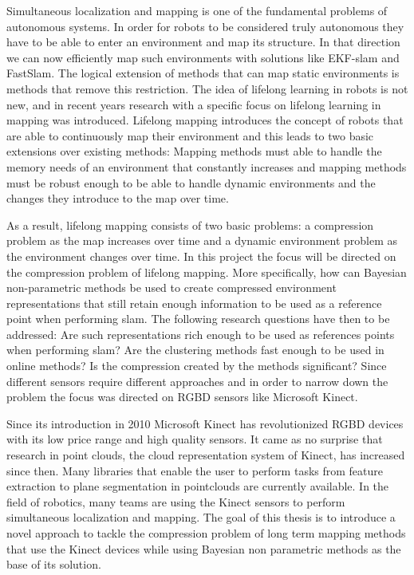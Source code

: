 \documentclass[twoside,hidelinks]{article}
\begin{document}
Simultaneous localization and mapping is one of the fundamental problems of autonomous systems\cite{probRobs}. In order for robots to be considered truly autonomous they have to be able to enter an environment and map its structure. In that direction we can now efficiently map such environments with solutions like EKF-slam\cite{ekf} and FastSlam\cite{slam}. The logical extension of methods that can map static environments is methods that remove this restriction. The idea of lifelong learning in robots is not new\cite{liflonglearning}, and in recent years research with a specific focus on lifelong learning in mapping\cite{lifelongmaps} was introduced.  Lifelong mapping introduces the concept of robots that are able to continuously map their environment and this leads to two basic extensions over existing methods: Mapping methods must able to handle the memory needs of an environment that constantly increases and mapping methods must be robust enough to be able to handle dynamic environments and the changes they introduce to the map over time.

As a result, lifelong mapping consists of two basic problems: a compression problem as the map increases over time and a dynamic environment problem as the environment changes over time\cite{aishalong}. In this project the focus will be directed on the compression problem of lifelong mapping. More specifically, how can Bayesian non-parametric methods be used to create compressed environment representations that still retain enough information to be used as a reference point when performing slam. The following research questions have then to be addressed: Are such representations rich enough to be used as references points when performing slam? Are the clustering methods fast enough to be used in online methods? Is the compression created by the methods significant? Since different sensors require different approaches and in order to narrow down the problem the focus was directed on RGBD sensors like Microsoft Kinect. 

Since its introduction in 2010 Microsoft Kinect\cite{kinect} has revolutionized RGBD devices with its low price range and high quality sensors. It came as no surprise that research in point clouds, the cloud representation system of Kinect, has increased since then. Many libraries that enable the user to perform tasks from feature extraction to plane segmentation\cite{pcl} in pointclouds are currently available. In the field of robotics, many teams are using the Kinect sensors to perform simultaneous localization and mapping\cite{rtabmap}. The goal of this thesis is to introduce a novel approach to tackle the compression problem of long term mapping methods that use the Kinect devices while using Bayesian non parametric methods as the base of its solution.
\end{document}
